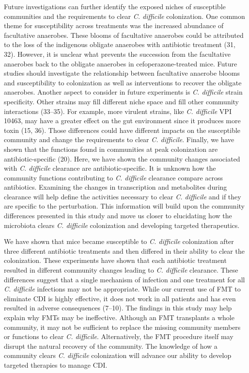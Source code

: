 \documentclass[11pt,]{article}
\begin{document}
Future investigations can further identify the exposed niches of
susceptible communities and the requirements to clear \emph{C.
difficile} colonization. One common theme for susceptibility across
treatments was the increased abundance of facultative anaerobes. These
blooms of facultative anaerobes could be attributed to the loss of the
indigenous obligate anaerobes with antibiotic treatment (31, 32).
However, it is unclear what prevents the succession from the facultative
anaerobes back to the obligate anaerobes in cefoperazone-treated mice.
Future studies should investigate the relationship between facultative
anaerobe blooms and susceptibility to colonization as well as
interventions to recover the obligate anaerobes. Another aspect to
consider in future experiments is \emph{C. difficile} strain
specificity. Other strains may fill different niche space and fill other
community interactions (33--35). For example, more virulent strains,
like \emph{C. difficile} VPI 10463, may have a greater effect on the gut
environment since it produces more toxin (15, 36). Those differences
could have different impacts on the susceptible community and change the
requirements to clear \emph{C. difficile}. Finally, we have shown that
the functions found in communities at peak colonization are
antibiotic-specific (20). Here, we have shown the community changes
associated with \emph{C. difficile} clearance are antibiotic-specific.
It is unknown how the community functions contributing to \emph{C.
difficile} clearance compare across antibiotics. Examining the changes
in transcription and metabolites during clearance will help define the
activities necessary to clear \emph{C. difficile} and if they are
specific to the perturbation. This information will build upon the
community differences presented in this study and move us closer to
elucidating how the microbiota clears \emph{C. difficile} colonization
and developing targeted therapeutics.

We have shown that mice became susceptible to \emph{C. difficile}
colonization after three different antibiotic treatments and then
differed in their ability to clear the colonization. These experiments
have shown that each antibiotic treatment resulted in different
community changes leading to \emph{C. difficile} clearance. These
differences suggest that a single mechanism of infection and one
treatment for all \emph{C. difficile} infections may not be appropriate.
While our current use of FMT to eliminate CDI is highly effective, it
does not work in all patients and has even resulted in adverse
consequences (7--10). The findings in this study may help explain why
FMTs may be ineffective. Although an FMT transplants a whole community,
it may not be sufficient to replace the missing community members or
functions to clear \emph{C. difficile}. Alternatively, the FMT procedure
itself may disrupt the natural recovery of the community. The knowledge
of how a community clears \emph{C. difficile} colonization will advance
our ability to develop targeted therapies to manage CDI.
\end{document}
